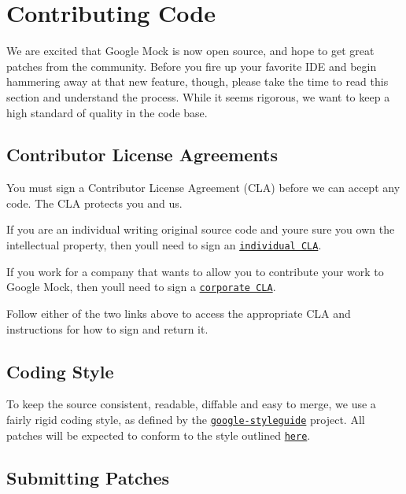 \section*{Contributing Code}

We are excited that Google Mock is now open source, and hope to get great patches from the community. Before you fire up your favorite I\+DE and begin hammering away at that new feature, though, please take the time to read this section and understand the process. While it seems rigorous, we want to keep a high standard of quality in the code base.

\subsection*{Contributor License Agreements}

You must sign a Contributor License Agreement (C\+LA) before we can accept any code. The C\+LA protects you and us.


\begin{DoxyItemize}
\item If you are an individual writing original source code and you\textquotesingle{}re sure you own the intellectual property, then you\textquotesingle{}ll need to sign an \href{http://code.google.com/legal/individual-cla-v1.0.html}{\tt individual C\+LA}.
\item If you work for a company that wants to allow you to contribute your work to Google Mock, then you\textquotesingle{}ll need to sign a \href{http://code.google.com/legal/corporate-cla-v1.0.html}{\tt corporate C\+LA}.
\end{DoxyItemize}

Follow either of the two links above to access the appropriate C\+LA and instructions for how to sign and return it.

\subsection*{Coding Style}

To keep the source consistent, readable, diffable and easy to merge, we use a fairly rigid coding style, as defined by the \href{https://github.com/google/styleguide}{\tt google-\/styleguide} project. All patches will be expected to conform to the style outlined \href{https://github.com/google/styleguide/blob/gh-pages/cppguide.xml}{\tt here}.

\subsection*{Submitting Patches}

